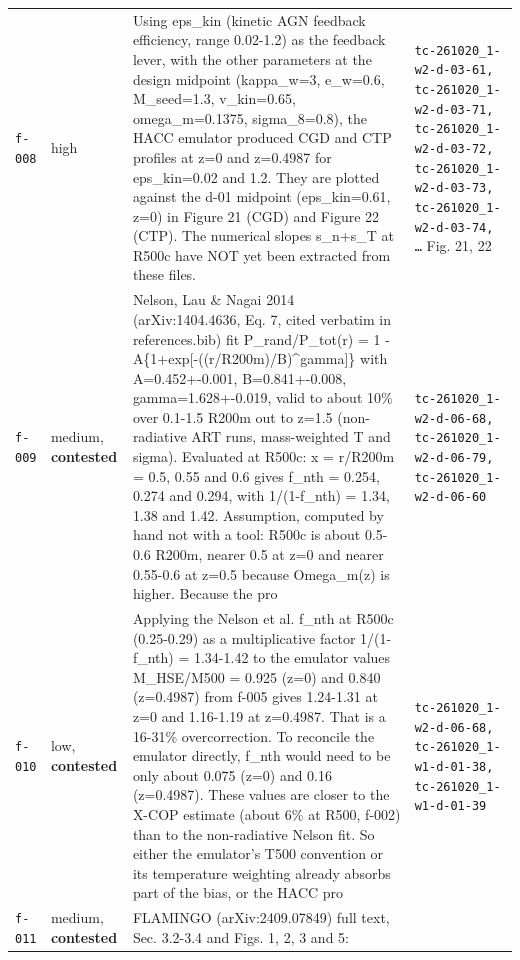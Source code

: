 \documentclass[11pt,a4paper]{article}
\begin{document}
\begin{longtable}{@{}p{}p{}p{}p{}@{}}
\texttt{f-008} & high & Using eps\_kin (kinetic AGN feedback efficiency, range 0.02-1.2) as the feedback lever, with the other parameters at the design midpoint (kappa\_w=3, e\_w=0.6, M\_seed=1.3, v\_kin=0.65, omega\_m=0.1375, sigma\_8=0.8), the HACC emulator produced CGD and CTP profiles at z=0 and z=0.4987 for eps\_kin=0.02 and 1.2. They are plotted against the d-01 midpoint (eps\_kin=0.61, z=0) in Figure 21 (CGD) and Figure 22 (CTP). The numerical slopes s\_n+s\_T at R500c have NOT yet been extracted from these files. & \texttt{tc-261020\_\allowbreak{}1-w2-d-03-61,\allowbreak{} tc-261020\_\allowbreak{}1-w2-d-03-71,\allowbreak{} tc-261020\_\allowbreak{}1-w2-d-03-72,\allowbreak{} tc-261020\_\allowbreak{}1-w2-d-03-73,\allowbreak{} tc-261020\_\allowbreak{}1-w2-d-03-74,\allowbreak{} \ldots{}\allowbreak{}} Fig. 21, 22 \\
\texttt{f-009} & medium, \textbf{contested} & Nelson, Lau \& Nagai 2014 (arXiv:1404.4636, Eq. 7, cited verbatim in references.bib) fit P\_rand/P\_tot(r) = 1 - A\{1+exp[-((r/R200m)/B)\textasciicircum{}gamma]\} with A=0.452+-0.001, B=0.841+-0.008, gamma=1.628+-0.019, valid to about 10\% over 0.1-1.5 R200m out to z=1.5 (non-radiative ART runs, mass-weighted T and sigma). Evaluated at R500c: x = r/R200m = 0.5, 0.55 and 0.6 gives f\_nth = 0.254, 0.274 and 0.294, with 1/(1-f\_nth) = 1.34, 1.38 and 1.42. Assumption, computed by hand not with a tool: R500c is about 0.5-0.6 R200m, nearer 0.5 at z=0 and nearer 0.55-0.6 at z=0.5 because Omega\_m(z) is higher. Because the pro & \texttt{tc-261020\_\allowbreak{}1-w2-d-06-68,\allowbreak{} tc-261020\_\allowbreak{}1-w2-d-06-79,\allowbreak{} tc-261020\_\allowbreak{}1-w2-d-06-60} \\
\texttt{f-010} & low, \textbf{contested} & Applying the Nelson et al. f\_nth at R500c (0.25-0.29) as a multiplicative factor 1/(1-f\_nth) = 1.34-1.42 to the emulator values M\_HSE/M500 = 0.925 (z=0) and 0.840 (z=0.4987) from f-005 gives 1.24-1.31 at z=0 and 1.16-1.19 at z=0.4987. That is a 16-31\% overcorrection. To reconcile the emulator directly, f\_nth would need to be only about 0.075 (z=0) and 0.16 (z=0.4987). These values are closer to the X-COP estimate (about 6\% at R500, f-002) than to the non-radiative Nelson fit. So either the emulator's T500 convention or its temperature weighting already absorbs part of the bias, or the HACC pro & \texttt{tc-261020\_\allowbreak{}1-w2-d-06-68,\allowbreak{} tc-261020\_\allowbreak{}1-w1-d-01-38,\allowbreak{} tc-261020\_\allowbreak{}1-w1-d-01-39} \\
\texttt{f-011} & medium, \textbf{contested} & FLAMINGO (arXiv:2409.07849) full text, Sec. 3.2-3.4 and Figs. 1, 2, 3 and 5:

\end{longtable}
\end{document}

